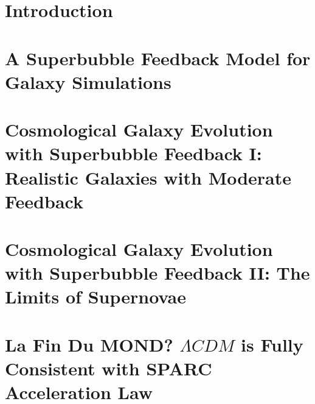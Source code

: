 \documentclass[letterpaper,12pt,twoside,openright]{report} %
\begin{document}
    \setcounter{secnumdepth}{3} %
    \tableofcontents %
    \cleardoublepage
    \listoffigures 
    \let\cleardoublepage\clearpage %
    \cleardoublepage
    \listoftables 
    \let\cleardoublepage\clearpage


    \pagestyle{fancy}
    \fancyhead{}
    \fancyfoot{}
    \fancyfoot[CE,CO]{\thepage}



\chapter{Introduction}
\thispagestyle{fancy}

\chapter{A Superbubble Feedback Model for Galaxy Simulations}
\thispagestyle{fancy}
%
\chapter{Cosmological Galaxy Evolution with Superbubble Feedback I: Realistic
Galaxies with Moderate Feedback}
\thispagestyle{fancy}
%
\chapter{Cosmological Galaxy Evolution with Superbubble Feedback II: The Limits
of Supernovae}
\thispagestyle{fancy}
%
\chapter{La Fin Du MOND? $\Lambda CDM$ is Fully Consistent with SPARC
Acceleration Law}
\thispagestyle{fancy}
%
\end{document}
